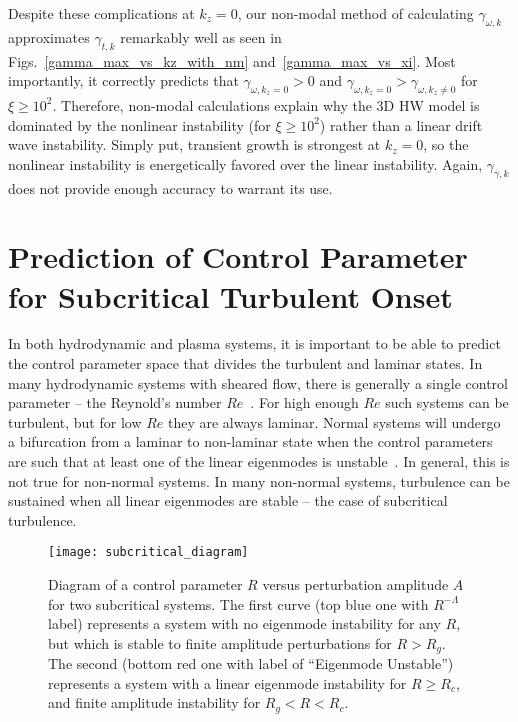 \documentclass[letter,scriptaddress,twocolumn, prl,showkeys]{revtex4}
\begin{document}
Despite these complications at $k_z=0$, our non-modal method of calculating $\gamma_{\omega,k}$ approximates $\gamma_{t,k}$ remarkably well as seen in Figs.~\ref{gamma_max_vs_kz_with_nm}
and~\ref{gamma_max_vs_xi}.
Most importantly, it correctly predicts that $\gamma_{\omega,k_z=0} > 0$ and $\gamma_{\omega,k_z=0} > \gamma_{\omega,k_z \ne 0}$ for $\xi \ge 10^{2}$. 
Therefore, non-modal calculations explain why the 3D HW model is dominated by the nonlinear instability (for $\xi \ge 10^{2}$) rather than a linear drift wave instability. 
Simply put, transient growth is strongest at $k_z=0$, so the nonlinear instability is energetically
favored over the linear instability. Again, $\gamma_{\gamma,k}$ does not provide enough accuracy to warrant its use.

\section{Prediction of Control Parameter for Subcritical Turbulent Onset}
\label{sec_subcrit_prediction}

In both hydrodynamic and plasma systems, it is important to be able to predict the control parameter space that divides the turbulent and laminar states.
In many hydrodynamic systems with sheared flow, there is generally a single control parameter -- the Reynold's number $Re$~\cite{drazin1981}. For high enough $Re$ such systems
can be turbulent, but for low $Re$ they are always laminar.
Normal systems will undergo a bifurcation from a laminar to non-laminar state when the control parameters are such that at least one of the linear eigenmodes is unstable~\cite{grossmann2000}.
In general, this is not true for non-normal systems. In many non-normal systems, turbulence can be sustained when all linear eigenmodes are stable -- the case of subcritical turbulence. 

\begin{figure}
\centerline{\texttt{[image: subcritical\_diagram]}}
\caption{Diagram of a control parameter $R$ versus perturbation amplitude $A$ for two subcritical systems. The first curve (top blue one with $R^{-\Lambda}$ label) represents a system with no
eigenmode instability for any $R$, but which is stable to finite amplitude perturbations for $R > R_g$. 
The second (bottom red one with label of ``Eigenmode Unstable'') represents a system with a linear eigenmode instability for $R \ge R_c$, and finite amplitude
instability for $R_g < R < R_c$.}
\label{subcritical_diagram}
\end{figure}
\end{document}
